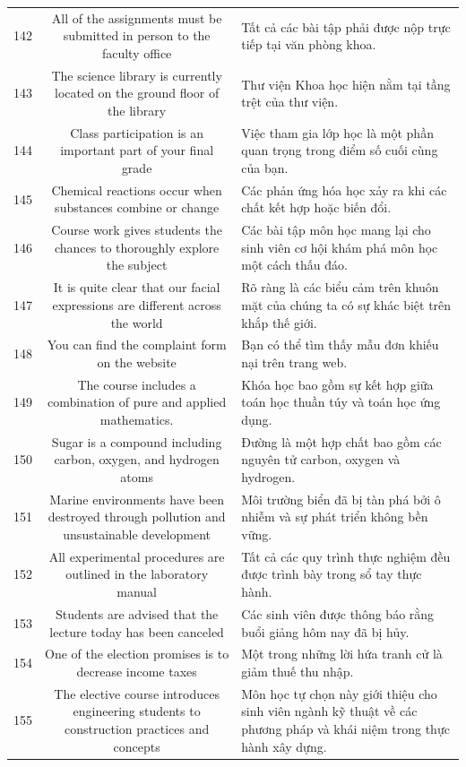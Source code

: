 \documentclass[11pt,a4paper]{article}
\begin{document}
\begin{longtable}{N S M}
142 & All of the assignments must be submitted in person to the faculty office & Tất cả các bài tập phải được nộp trực tiếp tại văn phòng khoa. \\
143 & The science library is currently located on the ground floor of the library & Thư viện Khoa học hiện nằm tại tầng trệt của thư viện. \\
144 & Class participation is an important part of your final grade & Việc tham gia lớp học là một phần quan trọng trong điểm số cuối cùng của bạn. \\
145 & Chemical reactions occur when substances combine or change & Các phản ứng hóa học xảy ra khi các chất kết hợp hoặc biến đổi. \\
146 & Course work gives students the chances to thoroughly explore the subject & Các bài tập môn học mang lại cho sinh viên cơ hội khám phá môn học một cách thấu đáo. \\
147 & It is quite clear that our facial expressions are different across the world & Rõ ràng là các biểu cảm trên khuôn mặt của chúng ta có sự khác biệt trên khắp thế giới. \\
148 & You can find the complaint form on the website & Bạn có thể tìm thấy mẫu đơn khiếu nại trên trang web. \\
149 & The course includes a combination of pure and applied mathematics. & Khóa học bao gồm sự kết hợp giữa toán học thuần túy và toán học ứng dụng. \\
150 & Sugar is a compound including carbon, oxygen, and hydrogen atoms & Đường là một hợp chất bao gồm các nguyên tử carbon, oxygen và hydrogen. \\
151 & Marine environments have been destroyed through pollution and unsustainable development & Môi trường biển đã bị tàn phá bởi ô nhiễm và sự phát triển không bền vững. \\
152 & All experimental procedures are outlined in the laboratory manual & Tất cả các quy trình thực nghiệm đều được trình bày trong sổ tay thực hành. \\
153 & Students are advised that the lecture today has been canceled & Các sinh viên được thông báo rằng buổi giảng hôm nay đã bị hủy. \\
154 & One of the election promises is to decrease income taxes & Một trong những lời hứa tranh cử là giảm thuế thu nhập. \\
155 & The elective course introduces engineering students to construction practices and concepts & Môn học tự chọn này giới thiệu cho sinh viên ngành kỹ thuật về các phương pháp và khái niệm trong thực hành xây dựng. \\

\end{longtable}
\end{document}
